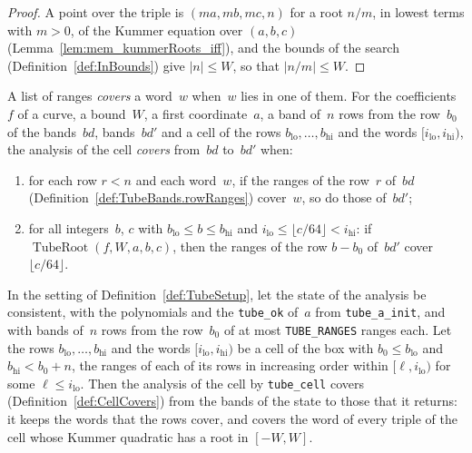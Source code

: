 \begin{proof}
  \leanok
  A point over the triple is $(ma, mb, mc, n)$ for a root $n/m$, in lowest terms with $m > 0$, of
  the Kummer equation over $(a, b, c)$ (Lemma~\ref{lem:mem_kummerRoots_iff}), and the bounds of the
  search (Definition~\ref{def:InBounds}) give $|n| \le W$, so that $|n/m| \le W$.
\end{proof}

\begin{definition}[Covers]\label{def:CellCovers}
  \leanok
  A list of ranges \emph{covers} a word~$w$ when~$w$ lies in one of them. For the coefficients~$f$
  of a curve, a bound~$W$, a first coordinate~$a$, a band of~$n$ rows from the row~$b_0$ of the
  bands~$\mathit{bd}$, bands~$\mathit{bd}'$ and a cell of the rows
  $b_{\mathrm{lo}}, \dots, b_{\mathrm{hi}}$ and the words $[i_{\mathrm{lo}}, i_{\mathrm{hi}})$, the
  analysis of the cell \emph{covers} from~$\mathit{bd}$ to~$\mathit{bd}'$ when:
  \begin{enumerate}
    \item for each row $r < n$ and each word~$w$, if the ranges of the row~$r$ of~$\mathit{bd}$
      (Definition~\ref{def:TubeBands.rowRanges}) cover~$w$, so do those of~$\mathit{bd}'$;
    \item for all integers~$b$, $c$ with $b_{\mathrm{lo}} \le b \le b_{\mathrm{hi}}$ and
      $i_{\mathrm{lo}} \le \lfloor c/64 \rfloor < i_{\mathrm{hi}}$: if
      $\operatorname{TubeRoot}(f, W, a, b, c)$, then the ranges of the row $b - b_0$
      of~$\mathit{bd}'$ cover $\lfloor c/64 \rfloor$.
  \end{enumerate}
\end{definition}

\begin{lemma}\label{lem:TubeSetup.cellCovers_run_tubeCell}
  \leanok
  In the setting of Definition~\ref{def:TubeSetup}, let the state of the analysis be consistent,
  with the polynomials and the \texttt{tube\_ok} of~$a$ from \texttt{tube\_a\_init}, and with bands
  of~$n$ rows from the row~$b_0$ of at most \texttt{TUBE\_RANGES} ranges each. Let the rows
  $b_{\mathrm{lo}}, \dots, b_{\mathrm{hi}}$ and the words $[i_{\mathrm{lo}}, i_{\mathrm{hi}})$ be a
  cell of the box with $b_0 \le b_{\mathrm{lo}}$ and $b_{\mathrm{hi}} < b_0 + n$, the ranges of
  each of its rows in increasing order within $[\ell, i_{\mathrm{lo}})$ for some
  $\ell \le i_{\mathrm{lo}}$. Then the analysis of the cell by \texttt{tube\_cell} covers
  (Definition~\ref{def:CellCovers}) from the bands of the state to those that it returns: it keeps
  the words that the rows cover, and covers the word of every triple of the cell whose Kummer
  quadratic has a root in $[-W, W]$.
\end{lemma}

